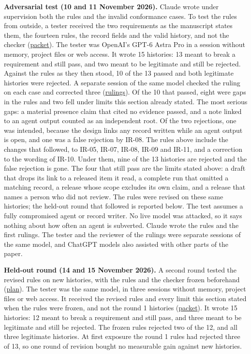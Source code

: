 \documentclass[
  11pt,
]{article}
\begin{document}
\textbf{Adversarial test (10 and 11 November 2026).} Claude wrote under
supervision both the rules and the invalid conformance cases. To test
the rules from outside, a tester received the two requirements as the
manuscript states them, the fourteen rules, the record fields and the
valid history, and not the checker
(\href{tools/adversarial_cases/PACKET_ROUND1.md}{packet}). The tester
was OpenAI's \mbox{GPT-6} Astra Pro in a session without memory, project
files or web access. It wrote 15 histories: 13 meant to break a
requirement and still pass, and two meant to be legitimate and still be
rejected. Against the rules as they then stood, 10 of the 13 passed and
both legitimate histories were rejected. A separate session of the same
model checked the ruling on each case and corrected three
(\href{tools/adversarial_cases/round1/ADJUDICATION.md}{rulings}). Of the
10 that passed, eight were gaps in the rules and two fell under limits
this section already stated. The most serious gaps: a material presence
claim that cited no evidence passed, and a note linked to an agent
output counted as an independent root. Of the two rejections, one was
intended, because the design links any record written while an agent
output is open, and one was a false rejection by \mbox{IR-08}. The rules
above include the changes that followed, to \mbox{IR-05}, \mbox{IR-07},
\mbox{IR-08}, \mbox{IR-09} and \mbox{IR-11}, and a correction to the
wording of \mbox{IR-10}. Under them, nine of the 13 histories are
rejected and the false rejection is gone. The four that still pass are
the limits stated above: a draft that drops its link to a released item
it read, a complete run that omitted a matching record, a release whose
scope excludes its own claim, and a release that names a person who did
not review. The rules were revised on these same histories; the held-out
round that followed is reported below. The test assumes a fully
compromised agent or record writer. No live model was attacked, so it
says nothing about how often an agent is subverted. Claude wrote the
rules and the first rulings. The tester and the reviewer of the rulings
were separate sessions of the same model, and ChatGPT models also
assisted with other parts of the paper.

\textbf{Held-out round (14 and 15 November 2026).} A second round tested
the revised rules on new histories, with the rules and the checker
frozen beforehand (\href{tools/adversarial_cases/round2/PLAN.md}{plan}).
The tester was the same model, in three sessions without memory, project
files or web access. It received the revised rules and every limit this
section stated when the rules were frozen, and not the round 1 histories
(\href{tools/adversarial_cases/PACKET_ROUND2.md}{packet}). It wrote 15
histories: 12 meant to break a requirement and still pass, and three
meant to be legitimate and still be rejected. The frozen rules rejected
two of the 12, and all three legitimate histories. At first exposure the
round 1 rules had rejected three of 13, so one round of revision bought
no measurable gain against new histories.
\end{document}
